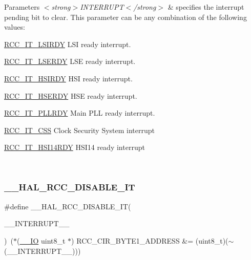 \begin{DoxyParams}{Parameters}
{\em $<$strong$>$\+I\+N\+T\+E\+R\+R\+U\+P\+T$<$/strong$>$} & specifies the interrupt pending bit to clear. This parameter can be any combination of the following values\+: \begin{DoxyItemize}
\item \hyperlink{group___r_c_c___interrupt_ga2b4ef277c1b71f96e0bef4b9a72fca94}{R\+C\+C\+\_\+\+I\+T\+\_\+\+L\+S\+I\+R\+DY} L\+SI ready interrupt. \item \hyperlink{group___r_c_c___interrupt_gad6b6e78a426850f595ef180d292a673d}{R\+C\+C\+\_\+\+I\+T\+\_\+\+L\+S\+E\+R\+DY} L\+SE ready interrupt. \item \hyperlink{group___r_c_c___interrupt_ga69637e51b71f73f519c8c0a0613d042f}{R\+C\+C\+\_\+\+I\+T\+\_\+\+H\+S\+I\+R\+DY} H\+SI ready interrupt. \item \hyperlink{group___r_c_c___interrupt_gad13eaede352bca59611e6cae68665866}{R\+C\+C\+\_\+\+I\+T\+\_\+\+H\+S\+E\+R\+DY} H\+SE ready interrupt. \item \hyperlink{group___r_c_c___interrupt_ga68d48e7811fb58f2649dce6cf0d823d9}{R\+C\+C\+\_\+\+I\+T\+\_\+\+P\+L\+L\+R\+DY} Main P\+LL ready interrupt. \item \hyperlink{group___r_c_c___interrupt_ga9bb34a4912d2084dc1c0834eb53aa7a3}{R\+C\+C\+\_\+\+I\+T\+\_\+\+C\+SS} Clock Security System interrupt \item \hyperlink{group___r_c_c___interrupt_ga3b85dd0ddf5c816fad2bb2c149129c01}{R\+C\+C\+\_\+\+I\+T\+\_\+\+H\+S\+I14\+R\+DY} H\+S\+I14 ready interrupt \end{DoxyItemize}
\\
\hline
\end{DoxyParams}
\mbox{\label{group___r_c_c___flags___interrupts___management_gafc4df8cd4df0a529d11f18bf1f7e9f50}} 
\subsubsection{\texorpdfstring{\+\_\+\+\_\+\+H\+A\+L\+\_\+\+R\+C\+C\+\_\+\+D\+I\+S\+A\+B\+L\+E\+\_\+\+IT}{\_\_HAL\_RCC\_DISABLE\_IT}}
{\footnotesize\ttfamily \#define \+\_\+\+\_\+\+H\+A\+L\+\_\+\+R\+C\+C\+\_\+\+D\+I\+S\+A\+B\+L\+E\+\_\+\+IT(\begin{DoxyParamCaption}\item[{}]{\+\_\+\+\_\+\+I\+N\+T\+E\+R\+R\+U\+P\+T\+\_\+\+\_\+ }\end{DoxyParamCaption})~($\ast$(\hyperlink{core__sc300_8h_aec43007d9998a0a0e01faede4133d6be}{\+\_\+\+\_\+\+IO} uint8\+\_\+t $\ast$) R\+C\+C\+\_\+\+C\+I\+R\+\_\+\+B\+Y\+T\+E1\+\_\+\+A\+D\+D\+R\+E\+SS \&= (uint8\+\_\+t)($\sim$(\+\_\+\+\_\+\+I\+N\+T\+E\+R\+R\+U\+P\+T\+\_\+\+\_\+)))}



